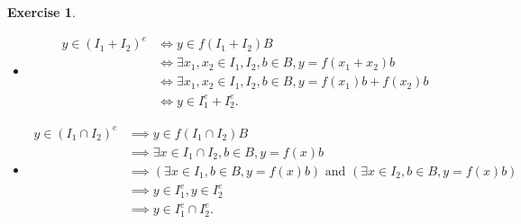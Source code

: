 \documentclass[12pt, psamsfonts]{amsart}
\theoremstyle{definition}
\newtheorem*{exer}{Exercise}
\theoremstyle{remark}
\numberwithin{equation}{section}
\begin{document}
\begin{exer}{2}
  \begin{itemize}
    \item
      \begin{align*}
        y \in (I_1 + I_2)^e
          &\iff y \in f(I_1 + I_2)B \\
          &\iff \exists x_1, x_2 \in I_1, I_2, b \in B, y = f(x_1 + x_2)b \\
          &\iff \exists x_1, x_2 \in I_1, I_2, b \in B, y = f(x_1)b + f(x_2)b \\
          &\iff y \in I_1^e + I_2^e.
      \end{align*}
    \item
      \begin{align*}
        y \in (I_1 \cap I_2)^e
          &\implies y \in f(I_1 \cap I_2)B \\
          &\implies \exists x \in I_1 \cap I_2, b \in B, y = f(x)b \\
          &\implies (\exists x \in I_1, b \in B, y = f(x)b) \text{ and } (\exists x \in I_2, b \in B, y = f(x)b) \\
          &\implies y \in I_1^e, y \in I_2^e \\
          &\implies y \in I_1^e \cap I_2^e.
      \end{align*}
  \end{itemize}
\end{exer}
\end{document}

